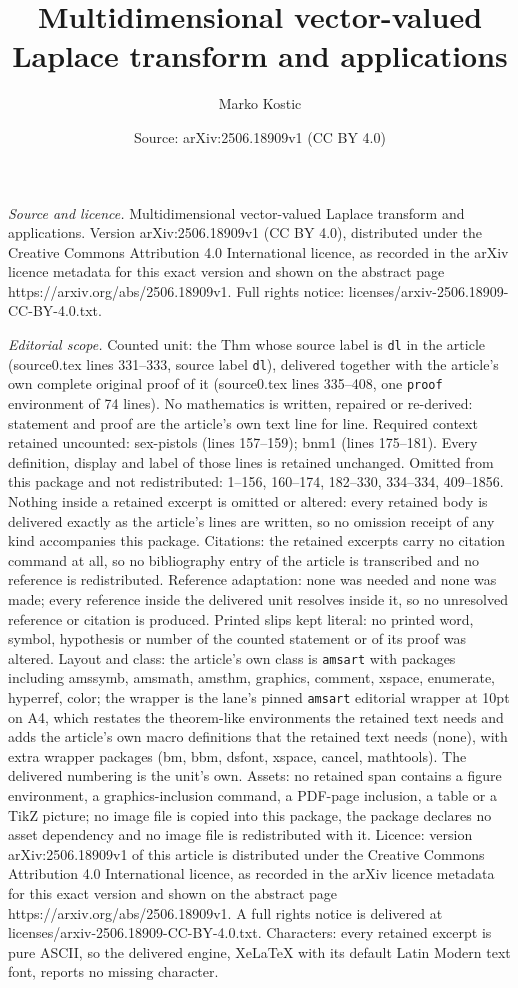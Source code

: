 \documentclass[10pt,a4paper]{amsart}
\title[Multidimensional vector-valued Laplace transform and applica]{Multidimensional vector-valued Laplace transform and applications}
\author{Marko Kostic}
\date{Source: arXiv:2506.18909v1 (CC BY 4.0)}
\begin{document}
\maketitle

\noindent\emph{Source and licence.} Multidimensional vector-valued Laplace transform and applications. Version arXiv:2506.18909v1 (CC BY 4.0), distributed under the Creative Commons Attribution 4.0 International licence, as recorded in the arXiv licence metadata for this exact version and shown on the abstract page https://arxiv.org/abs/2506.18909v1. Full rights notice: licenses/arxiv-2506.18909-CC-BY-4.0.txt.\par\smallskip

\noindent\textit{Editorial scope.} Counted unit: the Thm whose source label is \texttt{dl} in the article (source0.tex lines 331--333, source label \texttt{dl}), delivered together with the article's own complete original proof of it (source0.tex lines 335--408, one \texttt{proof} environment of 74 lines). No mathematics is written, repaired or re-derived: statement and proof are the article's own text line for line. Required context retained uncounted: sex-pistols (lines 157--159); bnm1 (lines 175--181). Every definition, display and label of those lines is retained unchanged. Omitted from this package and not redistributed: 1--156, 160--174, 182--330, 334--334, 409--1856. Nothing inside a retained excerpt is omitted or altered: every retained body is delivered exactly as the article's lines are written, so no omission receipt of any kind accompanies this package. Citations: the retained excerpts carry no citation command at all, so no bibliography entry of the article is transcribed and no reference is redistributed. Reference adaptation: none was needed and none was made; every reference inside the delivered unit resolves inside it, so no unresolved reference or citation is produced. Printed slips kept literal: no printed word, symbol, hypothesis or number of the counted statement or of its proof was altered. Layout and class: the article's own class is \texttt{amsart} with packages including amssymb, amsmath, amsthm, graphics, comment, xspace, enumerate, hyperref, color; the wrapper is the lane's pinned \texttt{amsart} editorial wrapper at 10pt on A4, which restates the theorem-like environments the retained text needs and adds the article's own macro definitions that the retained text needs (none), with extra wrapper packages (bm, bbm, dsfont, xspace, cancel, mathtools). The delivered numbering is the unit's own. Assets: no retained span contains a figure environment, a graphics-inclusion command, a PDF-page inclusion, a table or a TikZ picture; no image file is copied into this package, the package declares no asset dependency and no image file is redistributed with it. Licence: version arXiv:2506.18909v1 of this article is distributed under the Creative Commons Attribution 4.0 International licence, as recorded in the arXiv licence metadata for this exact version and shown on the abstract page https://arxiv.org/abs/2506.18909v1. A full rights notice is delivered at licenses/arxiv-2506.18909-CC-BY-4.0.txt. Characters: every retained excerpt is pure ASCII, so the delivered engine, XeLaTeX with its default Latin Modern text font, reports no missing character.
\end{document}
